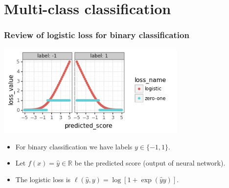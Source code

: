 \documentclass{beamer}
\begin{document}
\section{Multi-class classification}

\begin{frame}
  \frametitle{Review of logistic loss for binary classification}
  \includegraphics[width=0.7\textwidth]{2022-02-15-simplex-binary-loss-scores.png}

  \begin{itemize}
  \item For binary classification we have labels $y\in\{-1,1\}$.
  \item Let $f(x)=\hat y\in\mathbb R$ be the predicted score (output
    of neural network).
  \item The logistic loss is $\ell(\hat y, y) = \log[1+\exp(\hat y y)]$.
  \end{itemize}

\end{frame}
\end{document}
